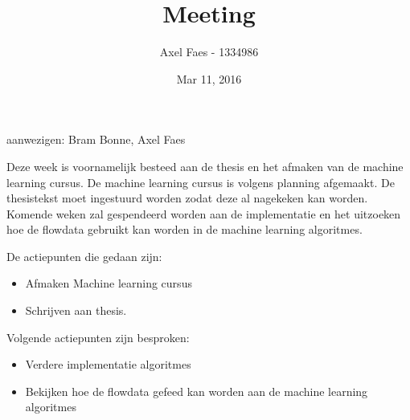 \documentclass[notitlepage]{article}
\title{Meeting}
\author{Axel Faes - 1334986}
\date{Mar 11, 2016}
\begin{document}
\maketitle

aanwezigen: Bram Bonne, Axel Faes

Deze week is voornamelijk besteed aan de thesis en het afmaken van de machine learning cursus. De machine learning cursus is volgens planning afgemaakt. De thesistekst moet ingestuurd worden zodat deze al nagekeken kan worden. Komende weken zal gespendeerd worden aan de implementatie en het uitzoeken hoe de flowdata gebruikt kan worden in de machine learning algoritmes.

De actiepunten die gedaan zijn:
\begin{itemize}  
		\item Afmaken Machine learning cursus
        \item Schrijven aan thesis.
\end{itemize}

Volgende actiepunten zijn besproken:
\begin{itemize}  		
		\item Verdere implementatie algoritmes
        \item Bekijken hoe de flowdata gefeed kan worden aan de machine learning algoritmes
\end{itemize}
\end{document}

